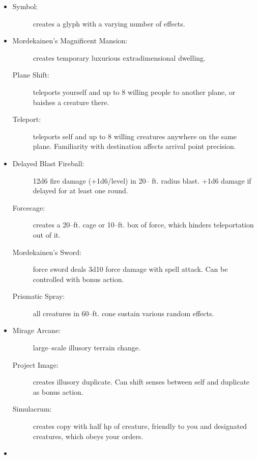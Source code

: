 \documentclass[DIV=14, paper=a4, fontsize=10pt, twocolumn, twoside]{scrartcl}
\begin{document}
\begin{itemize}[align=parleft,labelwidth=1cm]
	\renewcommand{\labelitemi}{Abjur}\item
	\begin{description}
 \item[Symbol:] creates a glyph with a varying number of effects.
\end{description}
\renewcommand{\labelitemi}{Conj}\item
\begin{description}
 \item[Mordekainen’s Magnificent Mansion:] creates temporary luxurious extradimensional dwelling.
 \item[Plane Shift:] teleports yourself and up to 8 willing people to another plane, or baishes a creature there.
 \item[Teleport:] teleports self and up to 8 willing creatures anywhere on the same plane. Familiarity with destination affects arrival point precision.
\end{description}
\renewcommand{\labelitemi}{Evoc}\item
\begin{description}
 \item[Delayed Blast Fireball:] 12d6 fire damage (+1d6/level) in 20– ft. radius blast. +1d6 damage if delayed for at least one round.
 \item[Forcecage:] creates a 20–ft. cage or 10–ft. box of force, which hinders teleportation out of it.
 \item[Mordekainen’s Sword:] force sword deals 3d10 force damage with spell attack. Can be controlled with bonus action.
 \item[Prismatic Spray:] all creatures in 60–ft. cone sustain various random effects.
\end{description}
\renewcommand{\labelitemi}{Illus}\item
\begin{description}
 \item[Mirage Arcane:] large–scale illusory terrain change.
 \item[Project Image:] creates illusory duplicate. Can shift senses between self and duplicate as bonus action.
 \item[Simulacrum:] creates copy with half hp of creature, friendly to you and designated creatures, which obeys your orders.
\end{description}
\renewcommand{\labelitemi}{Necro}\item
\begin{description}

\end{description}
\end{itemize}
\end{document}
